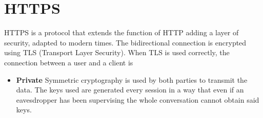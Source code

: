 \section{HTTPS}

HTTPS is a protocol that extends the function of HTTP adding a layer of security, adapted to modern times. The bidirectional connection is encrypted using TLS (Transport Layer Security).
When TLS is used correctly, the connection between a user and a client is
\begin{itemize}
	\item \textbf{Private} Symmetric cryptography is used by both parties to transmit the data. The keys used are generated every session in a way that even if an eavesdropper has been supervising the  whole conversation cannot obtain said keys.
\end{itemize}


